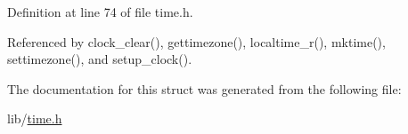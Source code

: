 Definition at line 74 of file time.\-h.



Referenced by clock\-\_\-clear(), gettimezone(), localtime\-\_\-r(), mktime(), settimezone(), and setup\-\_\-clock().



The documentation for this struct was generated from the following file\-:\begin{DoxyCompactItemize}
\item 
lib/\hyperlink{time_8h}{time.\-h}\end{DoxyCompactItemize}

